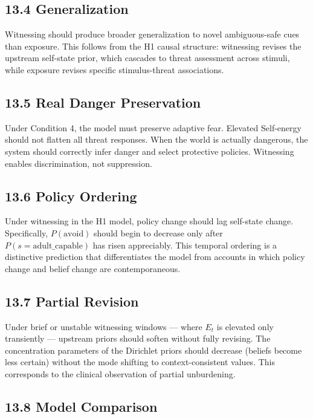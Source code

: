 \documentclass[11pt]{article}
\begin{document}
\subsection{13.4 Generalization}\label{generalization}

Witnessing should produce broader generalization to novel ambiguous-safe
cues than exposure. This follows from the H1 causal structure:
witnessing revises the upstream self-state prior, which cascades to
threat assessment across stimuli, while exposure revises specific
stimulus-threat associations.

\subsection{13.5 Real Danger
Preservation}\label{real-danger-preservation}

Under Condition 4, the model must preserve adaptive fear. Elevated
Self-energy should not flatten all threat responses. When the world is
actually dangerous, the system should correctly infer danger and select
protective policies. Witnessing enables discrimination, not suppression.

\subsection{13.6 Policy Ordering}\label{policy-ordering}

Under witnessing in the H1 model, policy change should lag self-state
change. Specifically, \(P(\text{avoid})\) should begin to decrease only
after \(P(s = \text{adult\_capable})\) has risen appreciably. This
temporal ordering is a distinctive prediction that differentiates the
model from accounts in which policy change and belief change are
contemporaneous.

\subsection{13.7 Partial Revision}\label{partial-revision-1}

Under brief or unstable witnessing windows --- where \(E_t\) is elevated
only transiently --- upstream priors should soften without fully
revising. The concentration parameters of the Dirichlet priors should
decrease (beliefs become less certain) without the mode shifting to
context-consistent values. This corresponds to the clinical observation
of partial unburdening.

\subsection{13.8 Model Comparison}\label{model-comparison}
\end{document}

